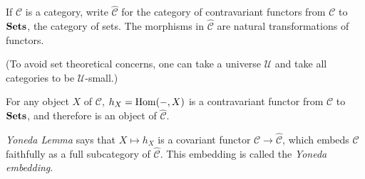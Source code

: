 \documentclass[12pt]{article}
\begin{document}
If $\mathcal{C}$ is a category, write $\hat{\mathcal{C}}$ for the category of contravariant functors from $\mathcal{C}$ to ${\bf Sets}$, the category of sets.  The morphisms in $\hat{\mathcal{C}}$ are natural transformations of functors.

(To avoid set theoretical concerns, one can take a universe $\mathcal{U}$ and take all categories to be $\mathcal{U}$-small.)

For any object $X$ of $\mathcal{C}$, $h_X = {\rm Hom}(-,X)$ is a contravariant functor from $\mathcal{C}$ to ${\bf Sets}$, and therefore is an object of $\hat{\mathcal{C}}$.  

\emph{Yoneda Lemma} says that $X\mapsto h_X$ is a covariant functor $\mathcal{C}\to\hat{\mathcal{C}}$, which embeds $\mathcal{C}$ faithfully as a full subcategory of $\hat{\mathcal{C}}$. This embedding is called the \emph{Yoneda embedding}.
\end{document}
